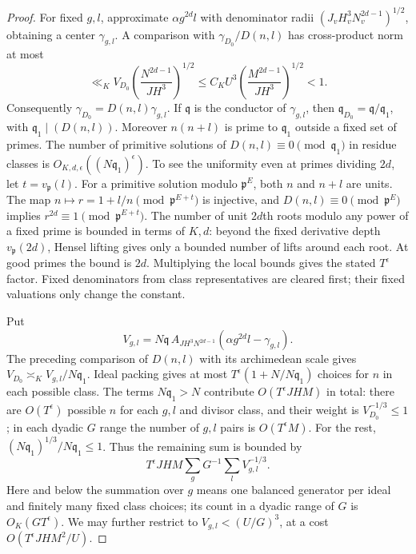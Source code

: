 \documentclass[11pt,reqno]{amsart}
\numberwithin{equation}{section}
\theoremstyle{definition}
\begin{document}
\begin{proof}
For fixed $g,l$, approximate $\alpha g^{2d}l$ with denominator radii
$(J_vH_v^3N_v^{2d-1})^{1/2}$, obtaining a center $\gamma_{g,l}$.
A comparison with $\gamma_{D_0}/D(n,l)$ has cross-product norm at most
\[
 \ll_K V_{D_0}
       \left(\frac{N^{2d-1}}{JH^3}\right)^{1/2}
 \le C_K U^3\left(\frac{M^{2d-1}}{JH^3}\right)^{1/2}<1.
\]
Consequently $\gamma_{D_0}=D(n,l)\gamma_{g,l}$.
If $\mathfrak q$ is the conductor of $\gamma_{g,l}$, then
$\mathfrak q_{D_0}=\mathfrak q/\mathfrak q_1$, with
$\mathfrak q_1\mid(D(n,l))$.
Moreover $n(n+l)$ is prime to $\mathfrak q_1$ outside a fixed set of primes.
The number of primitive solutions of $D(n,l)\equiv0\pmod{\mathfrak q_1}$
in residue classes is $O_{K,d,\epsilon}((N\mathfrak q_1)^{\epsilon})$.
To see the uniformity even at primes dividing $2d$, let
$t=v_{\mathfrak p}(l)$.  For a primitive solution modulo $\mathfrak p^E$,
both $n$ and $n+l$ are units.  The map
$n\mapsto r=1+l/n\pmod{\mathfrak p^{E+t}}$ is injective, and
$D(n,l)\equiv0\pmod{\mathfrak p^E}$ implies
$r^{2d}\equiv1\pmod{\mathfrak p^{E+t}}$.
The number of unit $2d$th roots modulo any power of a fixed prime is
bounded in terms of $K,d$: beyond the fixed derivative depth
$v_{\mathfrak p}(2d)$, Hensel lifting gives only a bounded number of
lifts around each root.  At good primes the bound is $2d$.
Multiplying the local bounds gives the stated $T^\epsilon$ factor.
Fixed denominators from class representatives are cleared first; their
fixed valuations only change the constant.

Put
\[
 V_{g,l}=N\mathfrak q\,
 A_{JH^3N^{2d-1}}(\alpha g^{2d}l-\gamma_{g,l}).
\]
The preceding comparison of $D(n,l)$ with its archimedean scale gives
$V_{D_0}\asymp_K V_{g,l}/N\mathfrak q_1$.
Ideal packing gives at most
$T^\epsilon(1+N/N\mathfrak q_1)$ choices for $n$ in each possible class.
The terms $N\mathfrak q_1>N$ contribute $O(T^\epsilon JHM)$ in total:
there are $O(T^\epsilon)$ possible $n$ for each $g,l$ and divisor class,
and their weight is $V_{D_0}^{-1/3}\le1$;
in each dyadic $G$ range the number of $g,l$ pairs is $O(T^\epsilon M)$.
For the rest, $(N\mathfrak q_1)^{1/3}/N\mathfrak q_1\le1$.
Thus the remaining sum is bounded by
\[
 T^\epsilon JHM\sum_gG^{-1}\sum_l V_{g,l}^{-1/3}.
\]
Here and below the summation over $g$ means one balanced generator per
ideal and finitely many fixed class choices; its count in a dyadic range
of $G$ is $O_K(GT^\epsilon)$.
We may further restrict to $V_{g,l}<(U/G)^3$, at a cost
$O(T^\epsilon JHM^2/U)$.


\end{proof}
\end{document}
